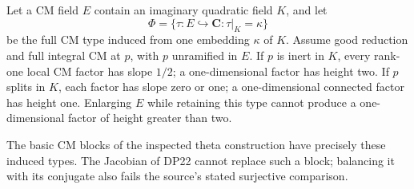\begin{proposition}\label{DP25}
Let a CM field $E$ contain an imaginary quadratic field $K$, and let
\[
 \Phi=\{\tau:E\hookrightarrow\mathbf C:\tau|_K=\kappa\}
\]
be the full CM type induced from one embedding $\kappa$ of $K$. Assume good reduction and full integral CM at $p$, with $p$ unramified in $E$. If $p$ is inert in $K$, every rank-one local CM factor has slope $1/2$; a one-dimensional factor has height two. If $p$ splits in $K$, each factor has slope zero or one; a one-dimensional connected factor has height one. Enlarging $E$ while retaining this type cannot produce a one-dimensional factor of height greater than two.

The basic CM blocks of the inspected theta construction have precisely these induced types. The Jacobian of DP22 cannot replace such a block; balancing it with its conjugate also fails the source's stated surjective comparison.
\end{proposition}
